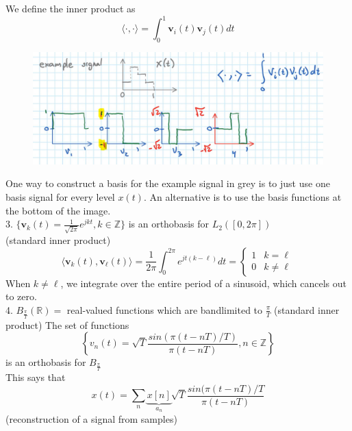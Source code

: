 \documentclass[12pt]{article}
\begin{document}
We define the inner product as 
\begin{equation*}
    \langle \cdot , \cdot \rangle = \int_0^1 \mathbf{v}_i(t) \mathbf{v}_j (t) dt
\end{equation*}
\begin{figure}[H]
    \centering
    \includegraphics[width=0.75\linewidth]{6250-L12-IMG1.JPG}
\end{figure}
One way to construct a basis for the example signal in grey is to just use one basis signal for every level $x(t)$. An alternative is to use the basis functions at the bottom of the image. \\
3. $\{ \mathbf{v}_k(t) = \frac{1}{\sqrt{2 \pi}}e^{jkt}, k \in \mathbb{Z}\}$ is an orthobasis for $L_2([0, 2\pi])$ \\
(standard inner product) \\
\begin{equation*}
    \langle \mathbf{v}_k(t), \mathbf{v}_{\ell}(t) \rangle = \frac{1}{2\pi} \int_0^{2\pi} e^{jt(k-\ell)} dt = 
    \begin{cases}
        1 & k=\ell \\
        0 & k \neq \ell
    \end{cases}   
\end{equation*}
When $k \neq \ell$, we integrate over the entire period of a sinusoid, which cancels out to zero. \\
4. $B_{\frac{\pi}{T}} (\mathbb{R}) = $ real-valued functions which are bandlimited to $\frac{\pi}{T}$ (standard inner product)
The set of functions
\begin{equation*}
    \left\{v_n(t) = \sqrt T \frac{sin(\pi (t-nT)/T)}{\pi (t-nT)} , n \in \mathbb{Z} \right\}
\end{equation*}
is an orthobasis for $B_{\frac{\pi}{T}}$ \\
This says that 
\begin{equation*}
    \boxed{x(t) = \sum_n \underbrace{x[n]}_{a_n} \sqrt T \frac{sin(\pi(t-nT)/T}{\pi (t-nT)}}
\end{equation*}
(reconstruction of a signal from samples) \\
\end{document}
